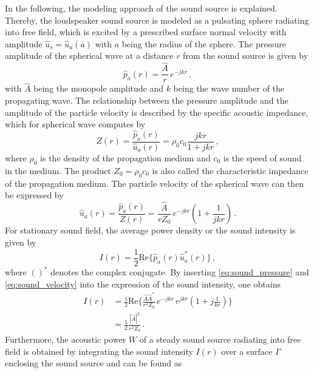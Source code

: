 {In the following, the modeling approach of the sound source is explained. Thereby, the loudspeaker sound source is modeled as a pulsating sphere radiating into free field, which is excited by a prescribed surface normal velocity with amplitude $\hat{u}_s = \hat{u}_a(a)$ with $a$ being the radius of the sphere. The pressure amplitude of the spherical wave at a distance $r$ from the sound source is given by
\begin{equation}
	\hat{p}_a(r) = \frac{\hat{A}}{r}\,e^{-jkr}\,, \label{eq:sound_pressure}
\end{equation}
with $\hat{A}$ being the monopole amplitude and $k$ being the wave number of the propagating wave. The relationship between the pressure amplitude and the amplitude of the particle velocity is described by the specific acoustic impedance, which for spherical wave computes by
\begin{equation}
	Z(r) = \frac{\hat{p}_a(r)}{\hat{u}_a(r)} = \rho_0 c_0\frac{jkr}{1+jkr}\,, \label{eq:specific_impedance}
\end{equation}
where $\rho_0$ is the density of the propagation medium and $c_0$ is the speed of sound in the medium. The product $Z_0 = \rho_0 c_0$ is also called the characteristic impedance of the propagation medium. The particle velocity of the spherical wave can then be expressed by
\begin{equation}
	\hat{u}_a(r) = \frac{\hat{p}_a(r)}{Z(r)} = \frac{\hat{A}}{r Z_0}\,e^{-jkr}\left(1+\frac{1}{jkr}\right)\,. \label{eq:sound_velocity}
\end{equation}
For stationary sound field, the average power density or the sound intensity is given by
\begin{equation}
	I(r) = \frac{1}{2}\text{Re}\lbrace\hat{p}_a(r)\hat{u}_a^*(r)\rbrace\,, \label{eq:sound_intensity}
\end{equation}
where $()^*$ denotes the complex conjugate. By inserting \cref{eq:sound_pressure} and \cref{eq:sound_velocity} into the expression of the sound intensity, one obtains
\begin{align}
	I(r) &= \frac{1}{2}\text{Re}\lbrace \frac{\hat{A}\hat{A}^*}{r^2 Z_0}\,e^{-jkr}\,e^{jkr}\left(1+j\frac{1}{kr}\right)\rbrace \nonumber\\
		 &=\frac{1}{2}\frac{|\hat{A}|^2}{r^2Z_0}\,.
\end{align}
Furthermore, the acoustic power $W$ of a steady sound source radiating into free field is obtained by integrating the sound intensity $I(r)$ over a surface $\Gamma$ enclosing the sound source and can be found as
}

